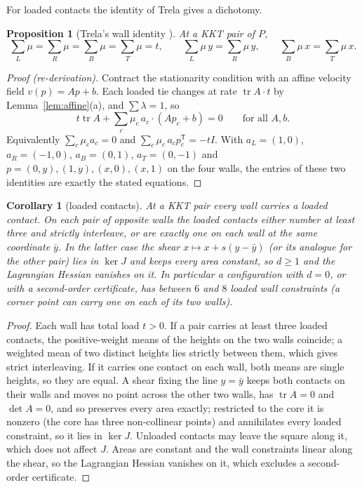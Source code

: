 \documentclass[11pt]{amsart}
\newtheorem{proposition}[theorem]{Proposition}
\newtheorem{corollary}[theorem]{Corollary}
\theoremstyle{definition}
\newcommand{\tr}{\operatorname{tr}}
\begin{document}
For loaded contacts the identity of Trela gives a dichotomy.

\begin{proposition}[Trela's wall identity {\cite[eq.~(17)--(18)]{Trela}}]\label{prop:trela}
At a KKT pair of $P$,
\[
  \textstyle\sum_{L}\mu = \sum_{R}\mu = \sum_{B}\mu = \sum_{T}\mu = t, \qquad \sum_L \mu\, y = \sum_R \mu\, y, \qquad \sum_B \mu\, x = \sum_T \mu\, x .
\]
\end{proposition}

\begin{proof}[Proof (re-derivation)]
Contract the stationarity condition with an affine velocity field $v(p) = Ap + b$. Each loaded tie changes at rate $\tr A \cdot t$ by Lemma~\ref{lem:affine}(a), and $\sum\lambda = 1$, so
\begin{equation}\label{eq:virial}
  t \tr A + \textstyle\sum_c \mu_c\, a_c \cdot (A p_c + b) = 0 \qquad \text{for all } A, b .
\end{equation}
Equivalently $\sum_c \mu_c a_c = 0$ and $\sum_c \mu_c\, a_c p_c^{\mathsf T} = -t I$. With $a_L = (1,0)$, $a_R = (-1,0)$, $a_B = (0,1)$, $a_T = (0,-1)$ and $p = (0,y), (1,y), (x,0), (x,1)$ on the four walls, the entries of these two identities are exactly the stated equations.
\end{proof}

\begin{corollary}[loaded contacts]\label{cor:loaded}
At a KKT pair every wall carries a loaded contact. On each pair of opposite walls the loaded contacts either number at least three and strictly interleave, or are exactly one on each wall at the same coordinate $\bar y$. In the latter case the shear $x \mapsto x + s(y-\bar y)$ (or its analogue for the other pair) lies in $\ker J$ and keeps every area constant, so $d \ge 1$ and the Lagrangian Hessian vanishes on it. In particular a configuration with $d = 0$, or with a second-order certificate, has between $6$ and $8$ loaded wall constraints (a corner point can carry one on each of its two walls).
\end{corollary}

\begin{proof}
Each wall has total load $t > 0$. If a pair carries at least three loaded contacts, the positive-weight means of the heights on the two walls coincide; a weighted mean of two distinct heights lies strictly between them, which gives strict interleaving. If it carries one contact on each wall, both means are single heights, so they are equal. A shear fixing the line $y = \bar y$ keeps both contacts on their walls and moves no point across the other two walls, has $\tr A = 0$ and $\det A = 0$, and so preserves every area exactly; restricted to the core it is nonzero (the core has three non-collinear points) and annihilates every loaded constraint, so it lies in $\ker J$. Unloaded contacts may leave the square along it, which does not affect $J$. Areas are constant and the wall constraints linear along the shear, so the Lagrangian Hessian vanishes on it, which excludes a second-order certificate.
\end{proof}
\end{document}
